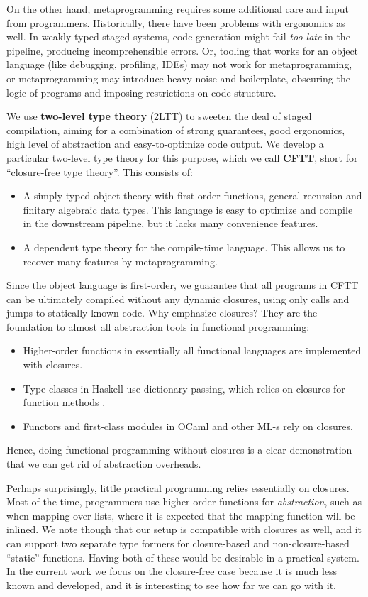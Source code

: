 \documentclass[acmsmall]{acmart}
\theoremstyle{remark}
\begin{document}
On the other hand, metaprogramming requires some additional care and input from
programmers. Historically, there have been problems with ergonomics as well. In
weakly-typed staged systems, code generation might fail \emph{too late} in the
pipeline, producing incomprehensible errors. Or, tooling that works for an
object language (like debugging, profiling, IDEs) may not work for metaprogramming, or
metaprogramming may introduce heavy noise and boilerplate, obscuring the logic
of programs and imposing restrictions on code structure.

We use \textbf{two-level type theory} (2LTT) \cite{twolevel,staged2ltt} to
sweeten the deal of staged compilation, aiming for a combination of strong
guarantees, good ergonomics, high level of abstraction and easy-to-optimize code
output. We develop a particular two-level type theory for this purpose, which we
call \textbf{CFTT}, short for ``closure-free type theory''. This consists of:
\begin{itemize}
\item A simply-typed object theory with first-order functions, general recursion and
      finitary algebraic data types. This language is easy to optimize and compile
      in the downstream pipeline, but it lacks many convenience features.
\item A dependent type theory for the compile-time language. This
      allows us to recover many features by metaprogramming.
\end{itemize}
Since the object language is first-order, we guarantee that all programs in CFTT
can be ultimately compiled without any dynamic closures, using only calls and
jumps to statically known code. Why emphasize closures?  They are the
foundation to almost all abstraction tools in functional programming:
\begin{itemize}
\item Higher-order functions in essentially all functional languages are implemented with closures.
\item Type classes in Haskell use dictionary-passing, which relies on closures for function methods \cite{DBLP:conf/popl/WadlerB89}.
\item Functors and first-class modules in OCaml \cite{leroy2023ocaml} and other ML-s rely on closures.
\end{itemize}
Hence, doing functional programming without closures is a clear demonstration
that we can get rid of abstraction overheads.

Perhaps surprisingly, little practical programming relies essentially on
closures. Most of the time, programmers use higher-order functions for
\emph{abstraction}, such as when mapping over lists, where it is expected that
the mapping function will be inlined. We note though that our setup is
compatible with closures as well, and it can support two separate type formers
for closure-based and non-closure-based ``static'' functions. Having both of
these would be desirable in a practical system. In the current work we focus on
the closure-free case because it is much less known and developed, and it is
interesting to see how far we can go with it.
\end{document}
